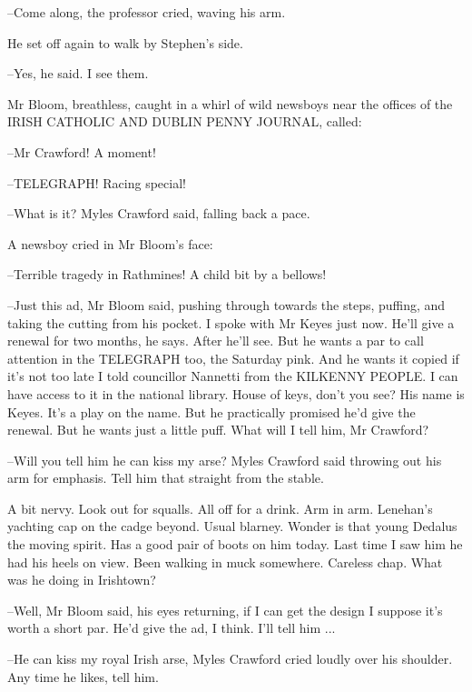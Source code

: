 --Come along, the professor cried, waving his arm.

He set off again to walk by Stephen's side.



--Yes, he said. I see them.

Mr Bloom, breathless, caught in a whirl of wild newsboys near the
offices of the IRISH CATHOLIC AND DUBLIN PENNY JOURNAL, called:

--Mr Crawford! A moment!

--TELEGRAPH! Racing special!

--What is it? Myles Crawford said, falling back a pace.

A newsboy cried in Mr Bloom's face:

--Terrible tragedy in Rathmines! A child bit by a bellows!




--Just this ad, Mr Bloom said, pushing through towards the steps,
puffing, and taking the cutting from his pocket. I spoke with Mr Keyes
just now. He'll give a renewal for two months, he says. After he'll see.
But he wants a par to call attention in the TELEGRAPH too, the Saturday
pink. And he wants it copied if it's not too late I told councillor
Nannetti from the KILKENNY PEOPLE. I can have access to it in the national
library. House of keys, don't you see? His name is Keyes. It's a play on
the name. But he practically promised he'd give the renewal. But he wants
just a little puff. What will I tell him, Mr Crawford?




--Will you tell him he can kiss my arse? Myles Crawford said throwing out
his arm for emphasis. Tell him that straight from the stable.

A bit nervy. Look out for squalls. All off for a drink. Arm in arm.
Lenehan's yachting cap on the cadge beyond. Usual blarney. Wonder is
that young Dedalus the moving spirit. Has a good pair of boots on him
today. Last time I saw him he had his heels on view. Been walking in muck
somewhere. Careless chap. What was he doing in Irishtown?

--Well, Mr Bloom said, his eyes returning, if I can get the design I
suppose it's worth a short par. He'd give the ad, I think. I'll tell
him ...



--He can kiss my royal Irish arse, Myles Crawford cried loudly over his
shoulder. Any time he likes, tell him.

